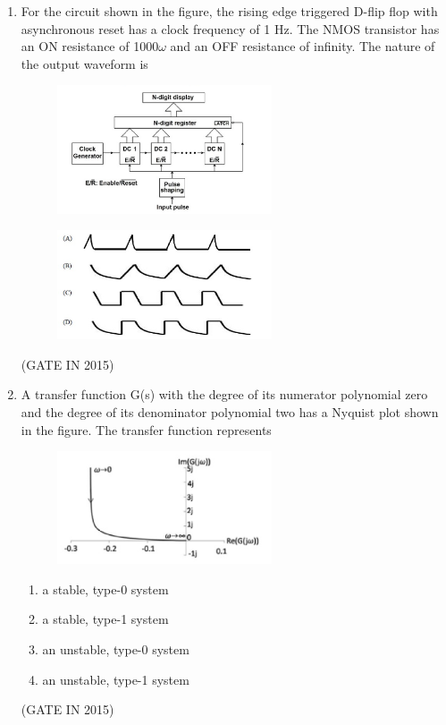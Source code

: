 \documentclass[journal]{IEEEtran}
\begin{document}
\begin{enumerate}
\item For the circuit shown in the figure, the rising edge triggered D-flip flop with asynchronous reset has a clock frequency of 1 Hz. The NMOS transistor has an ON resistance of 1000$\omega$ and an OFF resistance of infinity. The nature of the output waveform is
\begin{figure}[H]
    \centering
      \includegraphics[width=0.6\textwidth]{25.png} 
      \caption{}
    \label{fig:fig25} 
\end{figure}
\begin{figure}[H]
    \centering
      \includegraphics[width=0.6\textwidth]{26.png} 
      \caption{}
    \label{fig:fig26} 
\end{figure}
 \hfill(GATE IN 2015)

\item A transfer function G(s) with the degree of its numerator polynomial zero and the degree of its denominator polynomial two has a Nyquist plot shown in the figure. The transfer function represents
\begin{figure}[H]
    \centering
      \includegraphics[width=0.6\textwidth]{27.png} 
      \caption{}
    \label{fig:fig27} 
\end{figure}
\begin{multicols}{2}
\begin{enumerate}
\item a stable, type-0 system
\item a stable, type-1 system
\item an unstable, type-0 system
\item an unstable, type-1 system
\end{enumerate}
  \end{multicols} \hfill(GATE IN 2015)


\end{enumerate}
\end{document}
